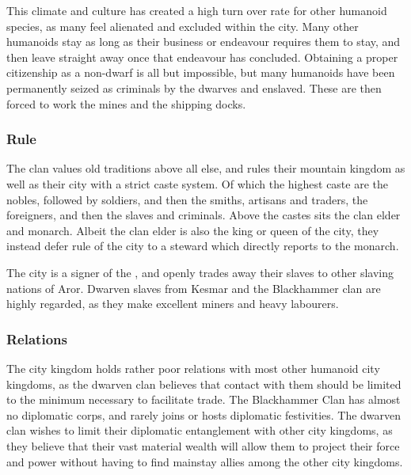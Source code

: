 This climate and culture has created a high turn over rate for other humanoid
species, as many feel alienated and excluded within the city. Many other
humanoids stay as long as their business or endeavour requires them to stay,
and then leave straight away once that endeavour has concluded. Obtaining a
proper citizenship as a non-dwarf is all but impossible, but many humanoids
have been permanently seized as criminals by the dwarves and enslaved. These
are then forced to work the mines and the shipping docks.

\subsubsection{Rule}

The clan values old traditions above all else, and rules their mountain
kingdom as well as their city with a strict caste system. Of which the highest
caste are the nobles, followed by soldiers, and then the smiths, artisans and
traders, the foreigners, and then the slaves and criminals. Above the castes
sits the clan elder and monarch. Albeit the clan elder is also the king or queen
of the city, they instead defer rule of the city to a steward which directly
reports to the monarch.

The city is a signer of the , and openly trades away
their slaves to other slaving nations of Aror. Dwarven slaves from Kesmar and
the Blackhammer clan are highly regarded, as they make excellent miners and
heavy labourers.

\subsubsection{Relations}

The city kingdom holds rather poor relations with most other humanoid city
kingdoms, as the dwarven clan believes that contact with them should be limited
to the minimum necessary to facilitate trade. The Blackhammer Clan has almost no
diplomatic corps, and rarely joins or hosts diplomatic festivities. The
dwarven clan wishes to limit their diplomatic entanglement with other city
kingdoms, as they believe that their vast material wealth will allow them to
project their force and power without having to find mainstay allies among the
other city kingdoms.
